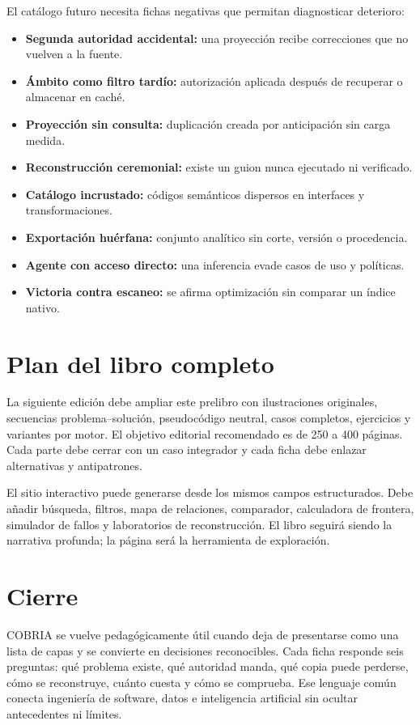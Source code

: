 \documentclass[11pt,oneside]{book}
\begin{document}
El catálogo futuro necesita fichas negativas que permitan diagnosticar deterioro:

\begin{itemize}[leftmargin=*]
\item \textbf{Segunda autoridad accidental:} una proyección recibe correcciones que no vuelven a la fuente.
\item \textbf{Ámbito como filtro tardío:} autorización aplicada después de recuperar o almacenar en caché.
\item \textbf{Proyección sin consulta:} duplicación creada por anticipación sin carga medida.
\item \textbf{Reconstrucción ceremonial:} existe un guion nunca ejecutado ni verificado.
\item \textbf{Catálogo incrustado:} códigos semánticos dispersos en interfaces y transformaciones.
\item \textbf{Exportación huérfana:} conjunto analítico sin corte, versión o procedencia.
\item \textbf{Agente con acceso directo:} una inferencia evade casos de uso y políticas.
\item \textbf{Victoria contra escaneo:} se afirma optimización sin comparar un índice nativo.
\end{itemize}

\chapter{Plan del libro completo}

La siguiente edición debe ampliar este prelibro con ilustraciones originales, secuencias
problema--solución, pseudocódigo neutral, casos completos, ejercicios y variantes por
motor. El objetivo editorial recomendado es de 250 a 400 páginas. Cada parte debe cerrar
con un caso integrador y cada ficha debe enlazar alternativas y antipatrones.

El sitio interactivo puede generarse desde los mismos campos estructurados. Debe añadir
búsqueda, filtros, mapa de relaciones, comparador, calculadora de frontera, simulador de
fallos y laboratorios de reconstrucción. El libro seguirá siendo la narrativa profunda;
la página será la herramienta de exploración.

\chapter{Cierre}

COBRIA se vuelve pedagógicamente útil cuando deja de presentarse como una lista de capas
y se convierte en decisiones reconocibles. Cada ficha responde seis preguntas: qué
problema existe, qué autoridad manda, qué copia puede perderse, cómo se reconstruye,
cuánto cuesta y cómo se comprueba. Ese lenguaje común conecta ingeniería de software,
datos e inteligencia artificial sin ocultar antecedentes ni límites.
\end{document}
